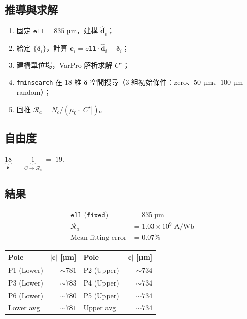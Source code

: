 \documentclass[11pt,a4paper]{article}
\newcommand{\mzero}{\mu_0}
\newcommand{\Ra}{\mathcal{R}_a}
\newcommand{\Nc}{N_c}
\newcommand{\cvec}{\mathbf{c}}
\newcommand{\dhat}{\hat{\mathbf{d}}}
\newcommand{\bdelta}{\bm{\delta}}
\begin{document}
\subsection{推導與求解}

\begin{enumerate}[leftmargin=*]
\item 固定 \(\texttt{ell} = 835\) µm，建構 \(\dhat_i\)；
\item 給定 \(\{\bdelta_i\}\)，計算 \(\cvec_i = \texttt{ell} \cdot \dhat_i + \bdelta_i\)；
\item 建構單位場，VarPro 解析求解 \(C^\star\)；
\item \texttt{fminsearch} 在 18 維 \(\bdelta\) 空間搜尋（3 組初始條件：zero、\(50\) µm、\(100\) µm random）；
\item 回推 \(\Ra = \Nc / (\mzero \cdot |C^\star|)\)。
\end{enumerate}

\subsection{自由度}
\(\underbrace{18}_{\bdelta} \;+\; \underbrace{1}_{C \to \Ra} \;=\; 19.\)

\subsection{結果}

\begin{align*}
\texttt{ell (fixed)} &= 835 \;\text{µm} \\
\Ra                  &= 1.03 \times 10^{9} \;\text{A/Wb} \\
\text{Mean fitting error} &= 0.07\%
\end{align*}

\begin{center}
\begin{tabular}{lrlr}
\toprule
Pole & \(|\cvec|\) [µm] & Pole & \(|\cvec|\) [µm] \\
\midrule
P1 (Lower) & \(\sim 781\) & P2 (Upper) & \(\sim 734\) \\
P3 (Lower) & \(\sim 783\) & P4 (Upper) & \(\sim 734\) \\
P6 (Lower) & \(\sim 780\) & P5 (Upper) & \(\sim 734\) \\
\midrule
Lower avg  & \(\sim 781\) & Upper avg  & \(\sim 734\) \\
\bottomrule
\end{tabular}
\end{center}
\end{document}
